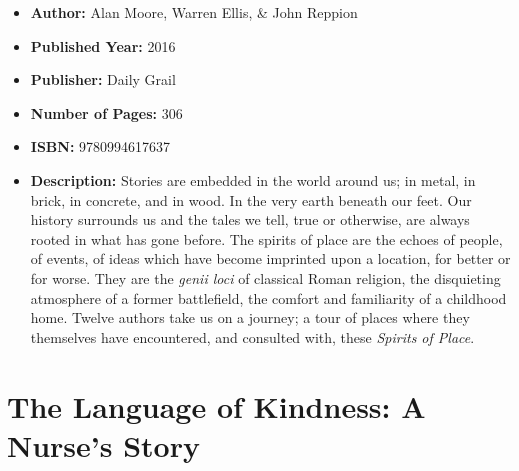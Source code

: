 \documentclass{tufte-handout}
\begin{document}
\begin{itemize}
    \item[] \textbf{Author:} Alan Moore, Warren Ellis, \& John Reppion
    \item[] \textbf{Published Year:} 2016
    \item[] \textbf{Publisher:} Daily Grail
    \item[] \textbf{Number of Pages:} 306
    \item[] \textbf{ISBN:} 9780994617637
    \item[] \textbf{Description:} Stories are embedded in the world around us; in metal, in brick, in concrete, and in wood. In the very earth beneath our feet. Our history surrounds us and the tales we tell, true or otherwise, are always rooted in what has gone before. The spirits of place are the echoes of people, of events, of ideas which have become imprinted upon a location, for better or for worse. They are the \textit{genii loci} of classical Roman religion, the disquieting atmosphere of a former battlefield, the comfort and familiarity of a childhood home. Twelve authors take us on a journey; a tour of places where they themselves have encountered, and consulted with, these \textit{Spirits of Place}.
\end{itemize}

\section*{The Language of Kindness: A Nurse's Story}
\end{document}
